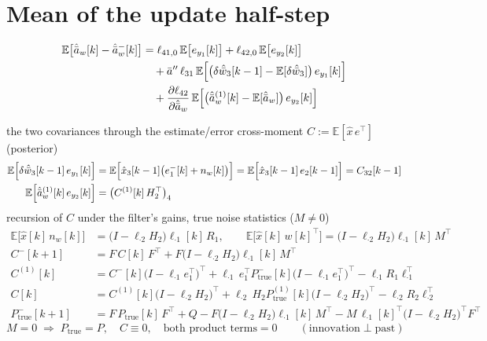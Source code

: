 \documentclass[11pt,a4paper,fontset=none]{ctexart}
\newcommand{\ba}{\bar{a}}
\newcommand{\bw}{\bar{w}}
\newcommand{\E}{\mathbb{E}}
\begin{document}
\section{Mean of the update half-step}

\begin{align*}
\E\bigl[\hat{\ba}_w[k] - \hat{\ba}_w^{-}[k]\bigr]
  &= \ell_{41,0}\,\E\bigl[e_{y_1}[k]\bigr] + \ell_{42,0}\,\E\bigl[e_{y_2}[k]\bigr] \\
  &\quad + \ba''\,\ell_{31}\,\E\Bigl[\bigl(\delta\hat{\bw}_3[k-1] - \E[\delta\hat{\bw}_3]\bigr)\,e_{y_1}[k]\Bigr] \\
  &\quad + \frac{\partial\ell_{42}}{\partial\hat{\ba}_w}\,\E\Bigl[\bigl(\hat{\ba}^{(1)}_w[k] - \E[\hat{\ba}_w]\bigr)\,e_{y_2}[k]\Bigr]
\end{align*}

the two covariances through the estimate/error cross-moment $C := \E[\hat{x}\,e^{\top}]$ (posterior)
\begin{align*}
\E\Bigl[\delta\hat{\bw}_3[k-1]\,e_{y_1}[k]\Bigr] &= \E\Bigl[\hat{x}_3[k-1]\bigl(e_1^{-}[k] + n_w[k]\bigr)\Bigr]
   = \E\Bigl[\hat{x}_3[k-1]\,e_2[k-1]\Bigr] = C_{32}[k-1] \\
\E\Bigl[\hat{\ba}^{(1)}_w[k]\,e_{y_2}[k]\Bigr] &= \bigl(C^{(1)}[k]\,H_2^{\top}\bigr)_4
\end{align*}
recursion of $C$ under the filter's gains, true noise statistics ($M \neq 0$)
\begin{align*}
\E\bigl[\hat{x}[k]\,n_w[k]\bigr] &= \bigl(I - \ell_{\cdot 2}H_2\bigr)\ell_{\cdot 1}[k]\,R_1 , \qquad
\E\bigl[\hat{x}[k]\,w[k]^{\top}\bigr] = \bigl(I - \ell_{\cdot 2}H_2\bigr)\ell_{\cdot 1}[k]\,M^{\top} \\
C^{-}[k+1] &= F\,C[k]\,F^{\top} + F\bigl(I - \ell_{\cdot 2}H_2\bigr)\ell_{\cdot 1}[k]\,M^{\top} \\
C^{(1)}[k] &= C^{-}[k]\bigl(I - \ell_{\cdot 1}e_1^{\top}\bigr)^{\top}
   + \ell_{\cdot 1}\,e_1^{\top}P^{-}_{\mathrm{true}}[k]\bigl(I - \ell_{\cdot 1}e_1^{\top}\bigr)^{\top}
   - \ell_{\cdot 1}R_1\ell_{\cdot 1}^{\top} \\
C[k] &= C^{(1)}[k]\bigl(I - \ell_{\cdot 2}H_2\bigr)^{\top}
   + \ell_{\cdot 2}\,H_2P^{(1)}_{\mathrm{true}}[k]\bigl(I - \ell_{\cdot 2}H_2\bigr)^{\top}
   - \ell_{\cdot 2}R_2\ell_{\cdot 2}^{\top} \\
P^{-}_{\mathrm{true}}[k+1] &= F\,P_{\mathrm{true}}[k]\,F^{\top} + Q
   - F\bigl(I - \ell_{\cdot 2}H_2\bigr)\ell_{\cdot 1}[k]\,M^{\top}
   - M\,\ell_{\cdot 1}[k]^{\top}\bigl(I - \ell_{\cdot 2}H_2\bigr)^{\top}F^{\top}
\end{align*}
\begin{equation*}
M = 0 \;\Rightarrow\; P_{\mathrm{true}} = P ,\quad C \equiv 0 ,\quad
\text{both product terms} = 0 \qquad (\text{innovation} \perp \text{past})
\end{equation*}
\end{document}
